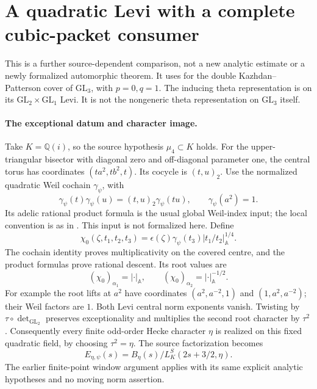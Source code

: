 \section{A quadratic Levi with a complete cubic-packet consumer}
\label{sec:quadratic-eisenstein-consumer}

This is a further source-dependent comparison, not a new analytic
estimate or a newly formalized automorphic theorem. It uses
\cite[Propositions 5.9--5.10 and Theorem 5.11]{GaoInverseEis} for
the double Kazhdan--Patterson cover of \(\mathrm{GL}_3\), with
\(p=0,q=1\). The inducing theta representation is on its
\(\mathrm{GL}_2\times\mathrm{GL}_1\) Levi. It is not the
nongeneric theta representation on \(\mathrm{GL}_3\) itself.

\paragraph{The exceptional datum and character image.}
Take \(K=\mathbb Q(i)\), so the source hypothesis \(\mu_4\subset K\)
holds. For the upper-triangular bisector with diagonal zero and
off-diagonal parameter one, the central torus has coordinates
\((ta^2,tb^2,t)\). Its cocycle is \((t,u)_2\).
Use the normalized quadratic Weil cochain \(\gamma_\psi\), with
\[
 \gamma_\psi(t)\gamma_\psi(u)
      =(t,u)_2\gamma_\psi(tu),\qquad
 \gamma_\psi(a^2)=1.
\]
Its adelic rational product formula is the usual global Weil-index
input; the local convention is as in \cite[Section 2.1]{PrasannaWeil}.
This input is not formalized here. Define
\[
 \chi_0(\zeta,t_1,t_2,t_3)
    =\epsilon(\zeta)\gamma_\psi(t_3)
      |t_1/t_2|_{\mathbb A}^{1/4}.
\]
The cochain identity proves multiplicativity on the covered centre,
and the product formulas prove rational descent. Its root values are
\[
 (\chi_0)_{\alpha_1}=|\cdot|_{\mathbb A},\qquad
 (\chi_0)_{\alpha_2}=|\cdot|_{\mathbb A}^{-1/2}.
\]
For example the root lifts at \(a^2\) have coordinates
\((a^2,a^{-2},1)\) and \((1,a^2,a^{-2})\); their Weil factors
are \(1\). Both Levi central norm exponents vanish.
Twisting by \(\tau\circ\det_{\mathrm{GL}_2}\) preserves
exceptionality and multiplies the second root character by \(\tau^2\).
Consequently every finite odd-order Hecke character \(\eta\)
is realized on this fixed quadratic field, by choosing \(\tau^2=\eta\).
The source factorization becomes
\begin{equation}\label{eq:quadratic-gl3-native}
 E_{\eta,\psi}(s)=B_\eta(s)/L_K^S(2s+3/2,\eta).
\end{equation}
The earlier finite-point window argument applies with its same
explicit analytic hypotheses and no moving norm assertion.

